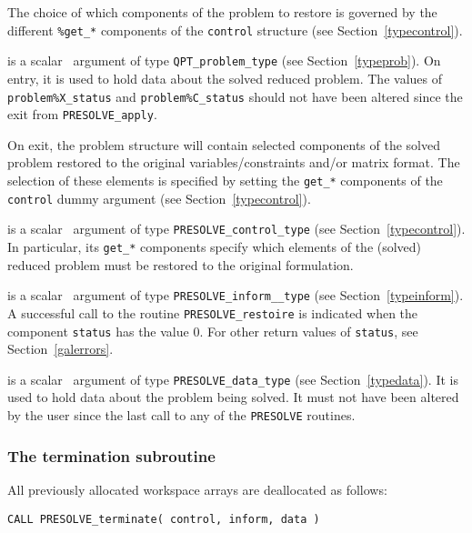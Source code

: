 \documentclass{galahad}
\newcommand{\packagename}{PRESOLVE}
\begin{document}
The choice of which components of the problem to restore is governed by the
different {\tt \%get\_*} components of the {\tt control} structure (see
Section~\ref{typecontrol}).

\begin{description}
 is a scalar \intentinout\ argument of type 
{\tt QPT\_problem\_type}
(see Section~\ref{typeprob}). 
On entry, it is used to hold data about the solved reduced problem. The values
of {\tt problem\%X\_status} and {\tt problem\%C\_status} should not have been
altered since the exit from {\tt \packagename\_apply}.

\noindent
On exit, the problem structure will contain selected components of the solved
problem restored to the original variables/constraints and/or matrix format.
The selection of these elements is specified by setting the {\tt get\_*}
components of the {\tt control} dummy argument (see
Section~\ref{typecontrol}).

 is a scalar \intentinout\ argument of type 
{\tt \packagename\_control\_type}
(see Section~\ref{typecontrol}).  In particular, its {\tt get\_*} components
specify which elements of the (solved) reduced problem must be restored to the
original formulation.

 is a scalar \intentinout\ argument of type 
{\tt \packagename\_inform\_\_type}
(see Section~\ref{typeinform}). A successful call to the routine
{\tt \packagename\_restoire}
is indicated when the  component {\tt status} has the value 0. 
For other return values of {\tt status}, see Section~\ref{galerrors}.

 is a scalar \intentinout\ argument of type 
{\tt \packagename\_data\_type}
(see Section~\ref{typedata}). It is used to hold data about the problem being 
solved. It must not have been altered by the user since the last call to 
any of the {\tt \packagename} routines.

\end{description}


\subsubsection{The  termination subroutine}
All previously allocated workspace arrays are deallocated as follows: 
\vspace*{1mm}

\hspace{8mm}
{\tt CALL \packagename\_terminate( control, inform, data )}
\end{document}

